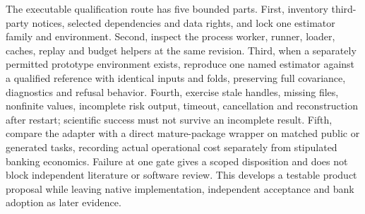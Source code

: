 The executable qualification route has five bounded parts. First, inventory
third-party notices, selected dependencies and data rights, and lock one
estimator family and environment. Second, inspect the process worker, runner,
loader, caches, replay and budget helpers at the same revision. Third, when a
separately permitted prototype environment exists, reproduce one named estimator
against a qualified reference with identical inputs and folds, preserving full
covariance, diagnostics and refusal behavior. Fourth, exercise stale handles,
missing files, nonfinite values, incomplete risk output, timeout, cancellation
and reconstruction after restart; scientific success must not survive an
incomplete result. Fifth, compare the adapter with a direct mature-package
wrapper on matched public or generated tasks, recording actual operational
cost separately from stipulated banking economics. Failure at one gate gives
a scoped disposition and does not block independent literature or software
review. This develops a testable product proposal while leaving native
implementation, independent acceptance and bank adoption as later evidence.
